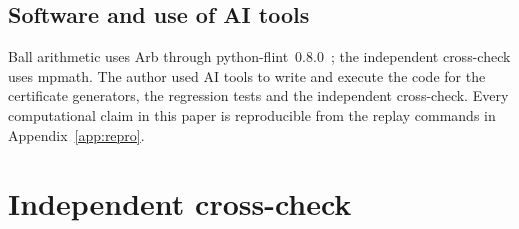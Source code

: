 \documentclass[11pt,a4paper]{article}
\theoremstyle{definition}
\begin{document}
\subsection*{Software and use of AI tools}
Ball arithmetic uses Arb through python-flint~0.8.0~\cite{Johansson2017};
the independent cross-check uses mpmath. The author used AI tools to write
and execute the code for the certificate generators, the regression tests
and the independent cross-check. Every computational claim in this paper
is reproducible from the replay commands in Appendix~\ref{app:repro}.

\appendix

\section{Independent cross-check}\label{app:crosscheck}
\end{document}
